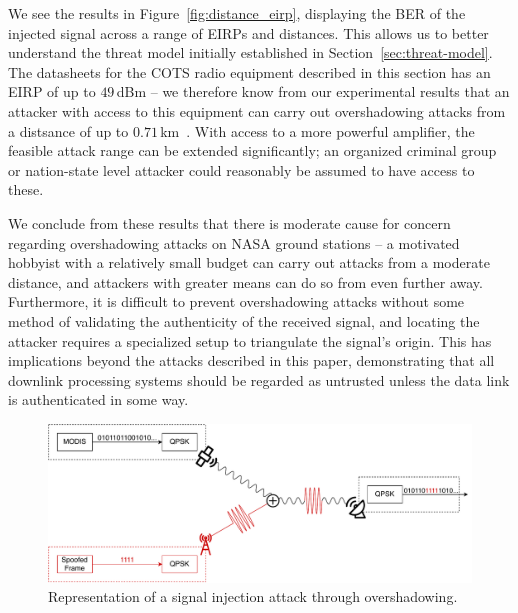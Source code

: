 We see the results in Figure~\ref{fig:distance_eirp}, displaying the BER of the injected signal across a range of EIRPs and distances.
This allows us to better understand the threat model initially established in Section~\ref{sec:threat-model}.
The datasheets for the COTS radio equipment described in this section has an EIRP of up to $49$\,dBm -- we therefore know from our experimental results that an attacker with access to this equipment can carry out overshadowing attacks from a distsance of up to $0.71$\,km~\cite{endurosat:xbandtransmitter,endurosat:xbandantenna}.
With access to a more powerful amplifier, the feasible attack range can be extended significantly; an organized criminal group or nation-state level attacker could reasonably be assumed to have access to these.

We conclude from these results that there is moderate cause for concern regarding overshadowing attacks on NASA ground stations -- a motivated hobbyist with a relatively small budget can carry out attacks from a moderate distance, and attackers with greater means can do so from even further away.
Furthermore, it is difficult to prevent overshadowing attacks without some method of validating the authenticity of the received signal, and locating the attacker requires a specialized setup to triangulate the signal's origin.
This has implications beyond the attacks described in this paper, demonstrating that all downlink processing systems should be regarded as untrusted unless the data link is authenticated in some way.

\begin{figure}
    \centering
    \includegraphics[width=\columnwidth]{diagrams/overshadowing_demo.pdf}
    \caption{Representation of a signal injection attack through overshadowing.}
    \label{fig:overshadowing_demo}
\end{figure}

